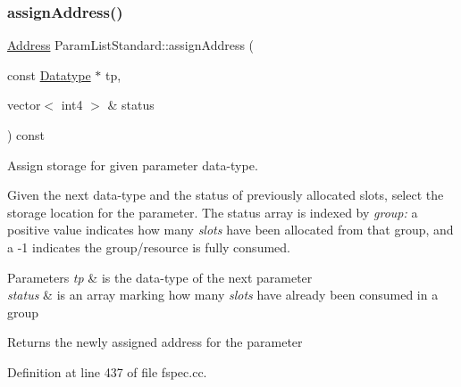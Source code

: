 \subsubsection{\texorpdfstring{assignAddress()}{assignAddress()}}
{\footnotesize\ttfamily \mbox{\hyperlink{class_address}{Address}} Param\+List\+Standard\+::assign\+Address (\begin{DoxyParamCaption}\item[{const \mbox{\hyperlink{class_datatype}{Datatype}} $\ast$}]{tp,  }\item[{vector$<$ int4 $>$ \&}]{status }\end{DoxyParamCaption}) const\hspace{0.3cm}{\ttfamily [protected]}}



Assign storage for given parameter data-\/type. 

Given the next data-\/type and the status of previously allocated slots, select the storage location for the parameter. The status array is indexed by {\itshape group\+:} a positive value indicates how many {\itshape slots} have been allocated from that group, and a -\/1 indicates the group/resource is fully consumed. 
\begin{DoxyParams}{Parameters}
{\em tp} & is the data-\/type of the next parameter \\
\hline
{\em status} & is an array marking how many {\itshape slots} have already been consumed in a group \\
\hline
\end{DoxyParams}
\begin{DoxyReturn}{Returns}
the newly assigned address for the parameter 
\end{DoxyReturn}


Definition at line 437 of file fspec.\+cc.

